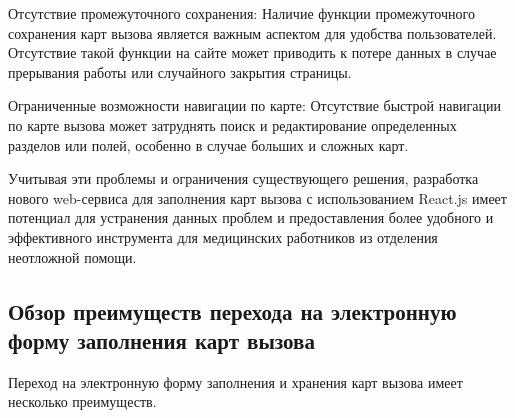 Отсутствие промежуточного сохранения: Наличие функции промежуточного сохранения карт вызова является важным аспектом для удобства пользователей. Отсутствие такой функции на сайте может приводить к потере данных в случае прерывания работы или случайного закрытия страницы.

Ограниченные возможности навигации по карте: Отсутствие быстрой навигации по карте вызова может затруднять поиск и редактирование определенных разделов или полей, особенно в случае больших и сложных карт.

Учитывая эти проблемы и ограничения существующего решения, разработка нового web-сервиса для заполнения карт вызова с использованием React.js имеет потенциал для устранения данных проблем и предоставления более удобного и эффективного инструмента для медицинских работников из отделения неотложной помощи.

\subsection{Обзор преимуществ перехода на электронную форму заполнения карт вызова}

Переход на электронную форму заполнения и хранения карт вызова имеет несколько преимуществ. 

